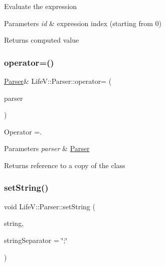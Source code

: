 Evaluate the expression 
\begin{DoxyParams}{Parameters}
{\em id} & expression index (starting from 0) \\
\hline
\end{DoxyParams}
\begin{DoxyReturn}{Returns}
computed value 
\end{DoxyReturn}
\mbox{\label{classLifeV_1_1Parser_a4dde1ca3f1f88623a91d8e498e274f52}} 
\subsubsection{\texorpdfstring{operator=()}{operator=()}}
{\footnotesize\ttfamily \hyperlink{classLifeV_1_1Parser}{Parser}\& Life\+V\+::\+Parser\+::operator= (\begin{DoxyParamCaption}\item[{const \hyperlink{classLifeV_1_1Parser}{Parser} \&}]{parser }\end{DoxyParamCaption})}



Operator =. 


\begin{DoxyParams}{Parameters}
{\em parser} & \hyperlink{classLifeV_1_1Parser}{Parser} \\
\hline
\end{DoxyParams}
\begin{DoxyReturn}{Returns}
reference to a copy of the class 
\end{DoxyReturn}
\mbox{\label{classLifeV_1_1Parser_ac05769e836a0dc95d9c020df361a5194}} 
\subsubsection{\texorpdfstring{set\+String()}{setString()}}
{\footnotesize\ttfamily void Life\+V\+::\+Parser\+::set\+String (\begin{DoxyParamCaption}\item[{const std\+::string \&}]{string,  }\item[{const std\+::string \&}]{string\+Separator = {\ttfamily \char`\"{};\char`\"{}} }\end{DoxyParamCaption})}

